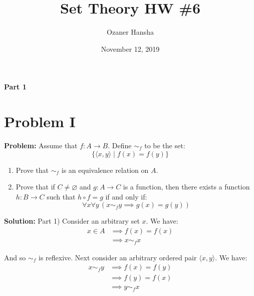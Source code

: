 \documentclass{article}
\begin{document}
\title{Set Theory HW \#6}
\author{Ozaner Hansha}
\date{November 12, 2019}
\maketitle

\newcommand{\pset}[1]{\mathfrak P#1}
\newcommand{\psetp}[1]{\mathfrak P(#1)}
\renewcommand{\wedge}{\,\,\&\,\,}
\renewcommand{\vee}{\text{ or }}
\newcommand{\pair}[2]{\langle#1,#2\rangle}
\newcommand{\triplet}[3]{\langle#1,#2,#3\rangle}
\renewcommand{\setminus}{-}


\begin{center}
    \Large{\textbf{Part 1}}
\end{center}

\section*{Problem I}
\noindent\textbf{Problem:} Assume that $f:A\to B$. Define $\sim_f$ to be the set:
\begin{equation*}
    \{\pair{x}{y}\mid f(x)=f(y)\}
\end{equation*}

\begin{enumerate}
    \item Prove that $\sim_f$ is an equivalence relation on $A$.
    \item Prove that if $C\not=\varnothing$ and $g:A\to C$ is a function, then there exists a function $h:B\to C$ such that $h\circ f=g$ if and only if:
    \begin{equation}
        \forall x\forall y\, \left(x\sim_f y\implies g(x)=g(y)\right)
    \end{equation}
\end{enumerate}
\medskip

\noindent\textbf{Solution:} Part 1) Consider an arbitrary set $x$. We have:
\begin{align*}
    x\in A&\implies f(x)=f(x)\\
    &\implies x\sim_f x\tag{def. of $\sim_f$}
\end{align*}

And so $\sim_f$ is reflexive. Next consider an arbitrary ordered pair $\pair{x}{y}$. We have:
\begin{align*}
    x\sim_fy&\implies f(x)=f(y)\tag{def. of $\sim_f$}\\
    &\implies f(y)=f(x)\\
    &\implies y\sim_fx\tag{def. of $\sim_f$}
\end{align*}
\end{document}
